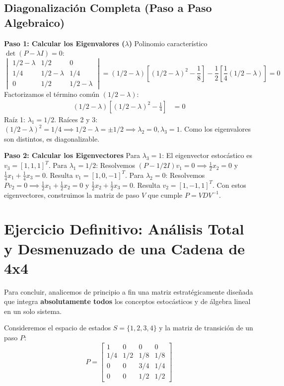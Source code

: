 \documentclass[12pt, a4paper]{article}
\begin{document}
\subsection{Diagonalización Completa (Paso a Paso Algebraico)}
\textbf{Paso 1: Calcular los Eigenvalores ($\lambda$)}
Polinomio característico $\det(P - \lambda I) = 0$:
$$ \begin{vmatrix} 1/2-\lambda & 1/2 & 0 \\ 1/4 & 1/2-\lambda & 1/4 \\ 0 & 1/2 & 1/2-\lambda \end{vmatrix} = (1/2-\lambda) \left[ (1/2-\lambda)^2 - \frac{1}{8} \right] - \frac{1}{2} \left[ \frac{1}{4}(1/2-\lambda) \right] = 0 $$
Factorizamos el término común $(1/2-\lambda)$:
\begin{align*}
    (1/2-\lambda) \left[ (1/2-\lambda)^2 - \frac{1}{4} \right] &= 0
\end{align*}
Raíz 1: $\lambda_1 = 1/2$. Raíces 2 y 3: $(1/2-\lambda)^2 = 1/4 \implies 1/2-\lambda = \pm 1/2 \implies \lambda_2=0, \lambda_3=1$.
Como los eigenvalores son distintos, es diagonalizable.

\textbf{Paso 2: Calcular los Eigenvectores}
Para $\lambda_3 = 1$: El eigenvector estocástico es $v_3 = [1, 1, 1]^T$.
Para $\lambda_1 = 1/2$: Resolvemos $(P - 1/2 I)v_1 = 0 \implies \frac{1}{2}x_2=0$ y $\frac{1}{4}x_1+\frac{1}{4}x_3=0$. Resulta $v_1 = [1, 0, -1]^T$.
Para $\lambda_2 = 0$: Resolvemos $Pv_2 = 0 \implies \frac{1}{2}x_1+\frac{1}{2}x_2=0$ y $\frac{1}{2}x_2+\frac{1}{2}x_3=0$. Resulta $v_2 = [1, -1, 1]^T$.
Con estos eigenvectores, construimos la matriz de paso $V$ que cumple $P = VDV^{-1}$.

\section{Ejercicio Definitivo: Análisis Total y Desmenuzado de una Cadena de 4x4}
Para concluir, analicemos de principio a fin una matriz estratégicamente diseñada que integra \textbf{absolutamente todos} los conceptos estocásticos y de álgebra lineal en un solo sistema. 

Consideremos el espacio de estados $S = \{1, 2, 3, 4\}$ y la matriz de transición de un paso $P$:
$$ P = \begin{bmatrix} 1 & 0 & 0 & 0 \\ 1/4 & 1/2 & 1/8 & 1/8 \\ 0 & 0 & 3/4 & 1/4 \\ 0 & 0 & 1/2 & 1/2 \end{bmatrix} $$
\end{document}
